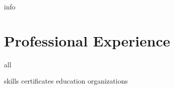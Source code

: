 \documentclass[letterpaper,11pt]{article}
\begin{document}
{info}

\section{Professional Experience}
  {all}

{skills}
{certificates}
{education}
{organizations}
\end{document}
